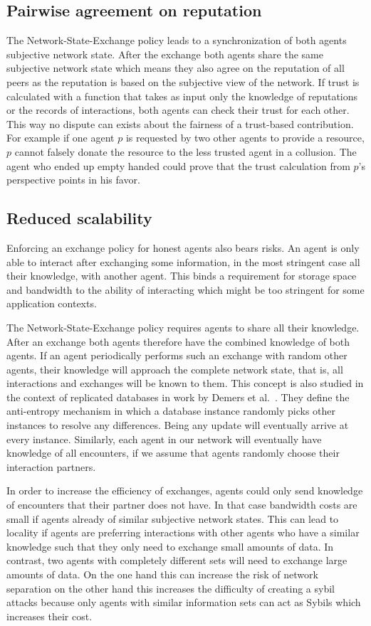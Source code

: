 \subsection{Pairwise agreement on reputation}
The Network-State-Exchange policy leads to a synchronization of both agents subjective network state.
After the exchange both agents share the same subjective network state which means they also agree
on the reputation of all peers as the reputation is based on the subjective view of the network.
If trust is calculated with a function that takes as input only the knowledge of reputations or the
records of interactions, both agents can check their trust for each other. This way no dispute can 
exists about the fairness of a trust-based contribution. For example if one agent $p$ is requested by 
two other agents to provide a resource, $p$ cannot falsely donate the resource to the less 
trusted agent in a collusion. The agent who ended up empty handed could prove that the trust 
calculation from $p$'s perspective points in his favor.

\subsection{Reduced scalability}
\label{sec:storage}
Enforcing an exchange policy for honest agents also bears risks. An agent is only able to interact
after exchanging some information, in the most stringent case all their knowledge, with another agent. 
This binds a requirement for storage space and bandwidth to the ability of interacting which might 
be too stringent for some application contexts. 

The Network-State-Exchange policy requires agents to share all their knowledge. After an exchange 
both agents therefore have the combined knowledge of both agents. If an agent periodically performs such an 
exchange with random other agents, their knowledge will approach the complete network state, that 
is, all interactions and exchanges will be known to them. This concept is also studied in the context
of replicated databases in work by Demers et al.\ \cite{demers1987epidemic}. They define the anti-entropy
mechanism in which a database instance randomly picks other instances to resolve any differences. Being
any update will eventually arrive at every instance. Similarly, each agent in our network will eventually 
have knowledge of all encounters, if we assume that agents randomly choose their interaction partners.

In order to increase the efficiency of exchanges, agents could only send knowledge of encounters 
that their partner does not have. In that case bandwidth costs are small if agents already of similar subjective network states.
This can lead to locality if agents are preferring interactions with other agents who have a similar
knowledge such that they only need to exchange small amounts of data. In contrast, two agents with completely different sets will need to
exchange large amounts of data.
On the one hand this can increase the risk of network separation on the other hand this increases 
the difficulty of creating a sybil attacks because only agents with similar information sets can 
act as Sybils which increases their cost.


